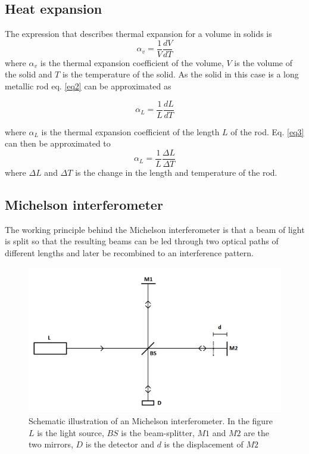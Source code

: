 \subsection{Heat expansion}
The expression that describes thermal expansion for a volume in solids is
\begin{equation}
	\alpha_v=\frac{1}{V}\frac{dV}{dT}
	\label{eq2}
\end{equation} 
where $\alpha_v$ is the thermal expansion coefficient of the volume, $V$ is the volume of the solid and $T$ is the temperature of the solid.
As the solid in this case is a long metallic rod eq. \eqref{eq2} can be approximated as

\begin{equation}
	\alpha_L=\frac{1}{L}\frac{dL}{dT}
	\label{eq3}
\end{equation}

where $\alpha_L$ is the thermal expansion coefficient of the length $L$ of the rod. Eq. \eqref{eq3} can then be approximated to
\begin{equation}
	\alpha_L=\frac{1}{L}\frac{\Delta L}{\Delta T}
	\label{eq4}
\end{equation}
where $\Delta L$ and $\Delta T$ is the change in the length and temperature of the rod.

\subsection{Michelson interferometer}
The working principle behind the Michelson interferometer is that a beam of light is split so that the resulting beams can be led through two optical paths of different lengths and later be recombined to an interference pattern.
 
\begin{figure}[htb]
	\centering
	\includegraphics[scale=0.25]{img/Int1}
	\caption{Schematic illustration of an Michelson interferometer. In the figure $L$ is the light source, $BS$ is the beam-splitter, $M1$ and $M2$ are the two mirrors, $D$ is the detector and $d$ is the displacement of $M2$}
	\label{fig1}
\end{figure}

